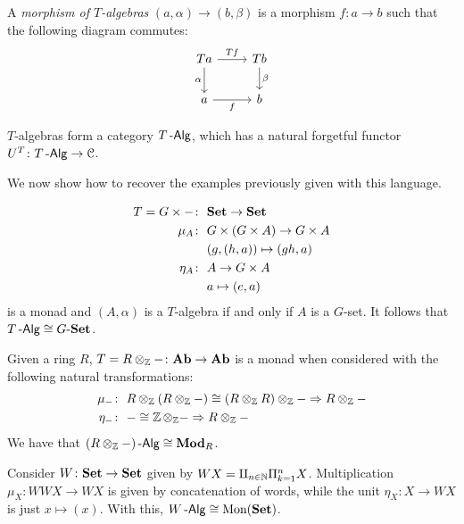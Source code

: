 \documentclass[a4paper,11pt,oneside,openany]{scrbook}
\begin{document}
\begin{defn}
	A \emph{morphism of $T$-algebras} $(a,\alpha)\rightarrow (b,\beta)$ is a morphism $f\colon a\rightarrow b$ such that the following diagram commutes:
	\[
		\begin{tikzcd}
			Ta\arrow["\alpha"']{d}\arrow["Tf"]{r}
			& Tb\arrow["\beta"]{d} \\
			a\arrow["f"']{r}
			& b
		\end{tikzcd}
	\]
\end{defn}


$T$-algebras form a category $T\operatorname{-\mathsf{Alg}}$, which has a natural forgetful functor $U^T\colon T\operatorname{-\mathsf{Alg}}\rightarrow\operatorname{\mathcal{C}}$.

We now show how to recover the examples previously given with this language.

\begin{exmp}
	\begin{align*}
		T=G\times - \colon & \ {\normalfont\textbf{Set}} \rightarrow{\normalfont\textbf{Set}}                      \\
		\mu_A\colon        & \ G\times (G\times A) \rightarrow G\times A \\
		                   & \ (g,(h,a)) \mapsto (gh,a)                  \\
		\eta_A\colon       & \ A \rightarrow G\times A                   \\
		                   & \ a \mapsto (e,a)
	\end{align*}
	is a monad and $(A,\alpha)$ is a $T$-algebra if and only if $A$ is a $G$-set. It follows that $T\operatorname{-\mathsf{Alg}}\cong G\mbox{-}{\normalfont\textbf{Set}}$.
\end{exmp}

\begin{exmp}
	Given a ring $R$, $T=R\otimes_{\operatorname{\mathbb{Z}}}-\colon {\normalfont\textbf{Ab}}\rightarrow {\normalfont\textbf{Ab}}$ is a monad when considered with the following natural transformations:
	\begin{align*}
		\mu_{-}\colon & \ R\otimes_{\operatorname{\mathbb{Z}}}(R\otimes_{\operatorname{\mathbb{Z}}}-)\cong (R\otimes_{\operatorname{\mathbb{Z}}}R)\otimes_{\operatorname{\mathbb{Z}}}-\Rightarrow R\otimes_{\operatorname{\mathbb{Z}}}- \\
		\eta_-\colon  & \ -\cong\operatorname{\mathbb{Z}}\otimes_{\operatorname{\mathbb{Z}}}-\Rightarrow R\otimes_{\operatorname{\mathbb{Z}}}-
	\end{align*}
	We have that $(R\otimes_{\operatorname{\mathbb{Z}}}-)\operatorname{-\mathsf{Alg}}\cong{\normalfont\textbf{Mod}}_R$.
\end{exmp}

\begin{exmp}
	Consider $W\colon{\normalfont\textbf{Set}}\rightarrow{\normalfont\textbf{Set}}$ given by $WX=\amalg_{n\in\operatorname{\mathbb{N}}}\Pi_{k=1}^n X$. Multiplication $\mu_X\colon WWX\rightarrow WX$ is given by concatenation of words, while the unit $\eta_X\colon X\rightarrow WX$ is just $x\mapsto (x)$. With this, $W\operatorname{-\mathsf{Alg}}\cong \text{Mon}({\normalfont\textbf{Set}})$.
\end{exmp}
\end{document}
